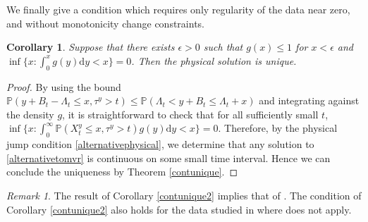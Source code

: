 \documentclass[11pt]{article}
\theoremstyle{plain}
\newtheorem{corollary}[theorem]{Corollary}
\theoremstyle{remark}
\newtheorem{remark}[theorem]{Remark}
\theoremstyle{definition}
\numberwithin{equation}{section}
\begin{document}
We finally give a condition which requires only regularity of the data near zero, and without monotonicity change constraints.
\begin{corollary}
\label{contunique3}
Suppose that there exists $\epsilon>0$ such that $g(x)\leq 1$ for $x<\epsilon$ and $\inf\{x:\int_0^xg(y)\textrm{d}y<x\}=0$. Then the physical solution is unique.
\end{corollary}

\begin{proof}
By using the bound $\mathbb{P}(y+B_t-\Lambda_t\leq x,\tau^y>t)\leq \mathbb{P}(\Lambda_t<y+B_t\leq \Lambda_t+x)$ and integrating against the density $g$, it is straightforward to check that for all sufficiently small $t$, $\inf\{x:\int_0^\infty \mathbb{P}(X_t^y\leq x,\tau^y>t)g(y)\textrm{d}y<x\}=0$. Therefore, by the physical jump condition \eqref{alternativephysical}, we determine that any solution to \eqref{alternativetomvr} is continuous on some small time interval. Hence we can conclude the uniqueness by Theorem \ref{contunique}.
\end{proof}

\begin{remark}
The result of Corollary \ref{contunique2} implies that of \cite[Theorem 1.1]{mustapha2023wellposednesssupercooledstefanproblem}. The condition of Corollary \ref{contunique2} also holds for the data studied in \cite[Sections 3,4]{mustapha2023wellposednesssupercooledstefanproblem} where \cite[Theorem 1.1]{mustapha2023wellposednesssupercooledstefanproblem} does not apply.
\end{remark}
\end{document}
